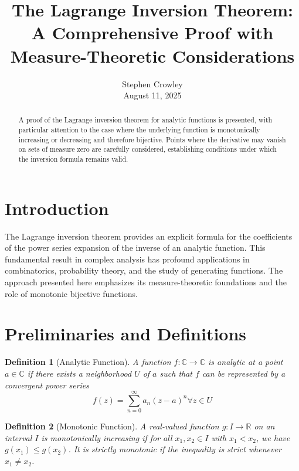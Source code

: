 \documentclass{article}
\newcommand{\tmaffiliation}[1]{\\ #1}
\newtheorem{definition}{Definition}
\begin{document}
\title{The Lagrange Inversion Theorem: A Comprehensive Proof with
Measure-Theoretic Considerations}

\author{
  Stephen Crowley
  \tmaffiliation{August 11, 2025}
}

\maketitle

\begin{abstract}
  A proof of the Lagrange inversion theorem for analytic functions is
  presented, with particular attention to the case where the underlying
  function is monotonically increasing or decreasing and therefore bijective.
  Points where the derivative may vanish on sets of measure zero are carefully
  considered, establishing conditions under which the inversion formula
  remains valid.
\end{abstract}

{\tableofcontents}

\section{Introduction}

The Lagrange inversion theorem provides an explicit formula for the
coefficients of the power series expansion of the inverse of an analytic
function. This fundamental result in complex analysis has profound
applications in combinatorics, probability theory, and the study of generating
functions. The approach presented here emphasizes its measure-theoretic
foundations and the role of monotonic bijective functions.

\section{Preliminaries and Definitions}

\begin{definition}
  [Analytic Function] A function $f : \mathbb{C} \to \mathbb{C}$ is analytic
  at a point $a \in \mathbb{C}$ if there exists a neighborhood $U$ of $a$ such
  that $f$ can be represented by a convergent power series
  \begin{equation}
    f (z) = \sum_{n = 0}^{\infty} a_n  (z - a)^n \forall z \in U
  \end{equation}
\end{definition}

\begin{definition}
  [Monotonic Function] A real-valued function $g : I \to \mathbb{R}$ on an
  interval $I$ is monotonically increasing if for all $x_1, x_2 \in I$ with
  $x_1 < x_2$, we have $g (x_1) \leq g (x_2)$. It is strictly monotonic if the
  inequality is strict whenever $x_1 \neq x_2$.
\end{definition}
\end{document}
